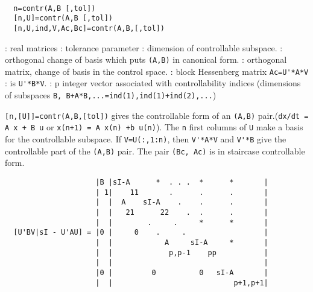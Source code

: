 \begin{mandesc}
   \\ %
\end{mandesc}
\begin{calling_sequence}
\begin{verbatim}
  n=contr(A,B [,tol])   
  [n,U]=contr(A,B [,tol])   
  [n,U,ind,V,Ac,Bc]=contr(A,B,[,tol])   
\end{verbatim}
\end{calling_sequence}
\begin{parameters}
  \begin{varlist}
    : real matrices
    : tolerance parameter
    :  dimension of controllable subspace.
    : orthogonal change of basis which puts \verb!(A,B)! in canonical form.
    : orthogonal matrix, change of basis in the control space.
    : block Hessenberg matrix \verb!Ac=U'*A*V!
    : is \verb!U'*B*V!.
    : p integer vector associated with controllability indices
    (dimensions of subspaces \verb!B, B+A*B,...=ind(1),ind(1)+ind(2),...!)
  \end{varlist}
\end{parameters}
\begin{mandescription}
  \verb![n,[U]]=contr(A,B,[tol])! gives the controllable form of an \verb!(A,B)! 
  pair.(\verb!dx/dt = A x + B u! or \verb!x(n+1) = A x(n) +b u(n)!).
  The \verb!n! first columns of \verb!U! make a basis for the controllable
  subspace.
  If \verb!V=U(:,1:n)!, then \verb!V'*A*V! and  \verb!V'*B! give the controllable part
  of the \verb!(A,B)! pair.
  The pair \verb!(Bc, Ac)! is in staircase controllable form.
\begin{verbatim}
                     |B |sI-A      *  . . .  *      *       |
                     | 1|    11       .      .      .       |
                     |  |  A    sI-A    .    .      .       |
                     |  |   21      22    .  .      .       |
                     |  |        .     .     *      *       |
  [U'BV|sI - U'AU] = |0 |     0    .     .                  |
                     |  |            A     sI-A     *       |
                     |  |             p,p-1    pp           |
                     |  |                                   |
                     |0 |         0          0   sI-A       |
                     |  |                            p+1,p+1|
\end{verbatim}
\end{mandescription}
